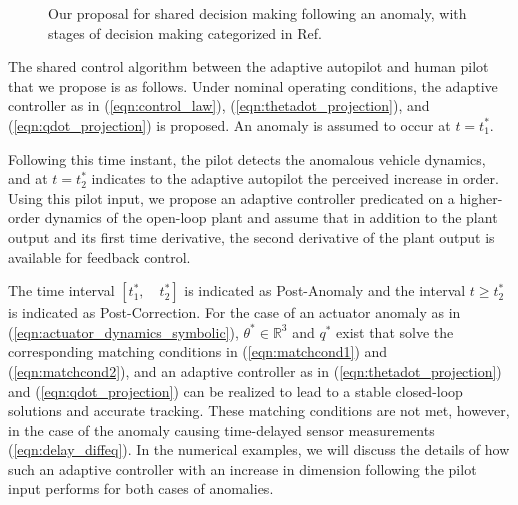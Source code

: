 \begin{figure}[h]

	\caption{Our proposal for shared decision making following an anomaly, with stages of decision making categorized in Ref.~\cite{parasuraman2000model}}
	\label{fig:response_flow}
\end{figure}

The shared control algorithm between the adaptive autopilot and human pilot that we propose is as follows. Under nominal operating conditions, the adaptive controller as in (\ref{eqn:control_law}), (\ref{eqn:thetadot_projection}), and (\ref{eqn:qdot_projection}) is proposed. An anomaly is assumed to occur at $t=t_1^*$. 

Following this time instant, the pilot detects the anomalous vehicle dynamics, and at $t=t_2^*$ indicates to the adaptive autopilot the perceived increase in order. Using this pilot input, we propose an adaptive controller predicated on a higher-order dynamics of the open-loop plant and assume that in addition to the plant output and its first time derivative, the second derivative of the plant output is available for feedback control. 

The time interval $[t_1^*, \quad t_2^*]$ is indicated as Post-Anomaly and the interval $t \geq t_2^*$ is indicated as Post-Correction. For the case of an actuator anomaly as in (\ref{eqn:actuator_dynamics_symbolic}), $\theta^* \in \mathbb{R}^3$ and $q^*$ exist that solve the corresponding matching conditions in (\ref{eqn:matchcond1}) and (\ref{eqn:matchcond2}), and an adaptive controller as in (\ref{eqn:thetadot_projection}) and (\ref{eqn:qdot_projection}) can be realized to lead to a stable closed-loop solutions and accurate tracking. These matching conditions are not met, however, in the case of the anomaly causing time-delayed sensor measurements (\ref{eqn:delay_diffeq}). In the numerical examples, we will discuss the details of how such an adaptive controller with an increase in dimension following the pilot input performs for both cases of anomalies. 

